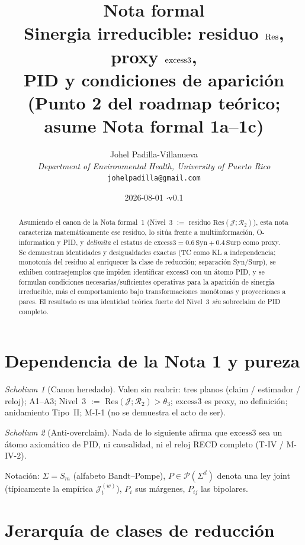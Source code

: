 \documentclass[11pt,a4paper]{article}
\title{\textbf{Nota formal}\\[0.4em]
\large Sinergia irreducible: residuo $\Res$, proxy $\excess$,\\
PID y condiciones de aparici\'on\\[0.6em]
\normalsize (Punto 2 del roadmap te\'orico; asume Nota formal 1a--1c)}
\author{
Johel Padilla-Villanueva\\
\textit{Department of Environmental Health, University of Puerto Rico}\\
\texttt{johelpadilla@gmail.com}
}
\date{2026-08-01 \quad$\cdot$\quad v0.1}
\theoremstyle{definition}
\theoremstyle{plain}
\theoremstyle{remark}
\newtheorem{scholium}{Scholium}[section]
\newcommand{\Res}{\mathrm{Res}}
\newcommand{\Syn}{\mathrm{Syn}}
\newcommand{\Surp}{\mathrm{Surp}}
\newcommand{\excess}{\mathrm{excess3}}
\newcommand{\Rtwo}{\mathcal{R}_{2}}
\newcommand{\Jwin}{\mathcal{J}}
\begin{document}
\maketitle

\begin{abstract}
Asumiendo el canon de la Nota formal~1 (Nivel~3 $:=$ residuo
$\Res(\Jwin;\Rtwo)$), esta nota caracteriza matem\'aticamente ese residuo,
lo sit\'ua frente a multiinformaci\'on, O-information y PID, y
\emph{delimita} el estatus de $\excess=0.6\,\Syn+0.4\,\Surp$ como proxy.
Se demuestran identidades y desigualdades exactas (TC como KL a
independencia; monoton\'ia del residuo al enriquecer la clase de
reducci\'on; separaci\'on Syn/Surp), se exhiben contraejemplos que impiden
identificar $\excess$ con un \'atomo PID, y se formulan condiciones
necesarias/suficientes operativas para la aparici\'on de sinergia
irreducible, m\'as el comportamiento bajo transformaciones mon\'otonas y
proyecciones a pares. El resultado es una identidad te\'orica fuerte del
Nivel~3 \emph{sin} sobreclaim de PID completo.
\end{abstract}

\tableofcontents
\vspace{1em}

\section{Dependencia de la Nota 1 y pureza}
\label{sec:dep}

\begin{scholium}[Canon heredado]
Valen sin reabrir: tres planos (claim / estimador / reloj);
A1--A3; Nivel~3 $:=$ $\Res(\Jwin;\Rtwo)>\theta_3$;
$\excess$ es proxy, no definici\'on; anidamiento Tipo~II;
M-I-1 (no se demuestra el acto de ser).
\end{scholium}

\begin{scholium}[Anti-overclaim]
Nada de lo siguiente afirma que $\excess$ sea un \'atomo axiom\'atico de
PID, ni causalidad, ni el reloj RECD completo (T-IV / M-IV-2).
\end{scholium}

Notaci\'on: $\Sigma=S_m$ (alfabeto Bandt--Pompe), $P\in\mathcal{P}(\Sigma^d)$
denota una ley joint (t\'ipicamente la emp\'irica $\Jwin_t^{(w)}$),
$P_i$ sus m\'argenes, $P_{ij}$ las bipolares.

\section{Jerarqu\'ia de clases de reducci\'on}
\label{sec:classes}
\end{document}
